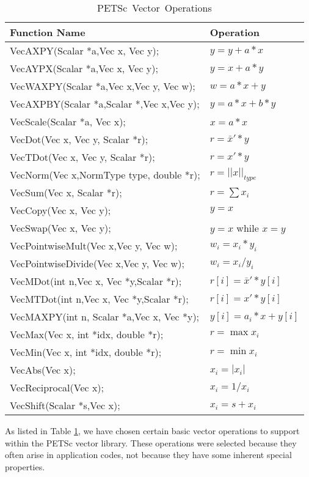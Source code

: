 \begin{table}[tb]
\begin{center}
\begin{tabular}{ll}
{\bf Function Name} & {\bf Operation} \\
\hline
VecAXPY(Scalar *a,Vec x, Vec y); & $y = y + a*x$ \\
VecAYPX(Scalar *a,Vec x, Vec y); & $y = x + a*y$ \\
VecWAXPY(Scalar *a,Vec x,Vec y, Vec w); & $w = a*x + y$ \\
VecAXPBY(Scalar *a,Scalar *,Vec x,Vec y); & $y = a*x + b*y$\\
VecScale(Scalar *a, Vec x); & $ x = a*x $\\
VecDot(Vec x, Vec y, Scalar *r); & $ r = \bar{x}'*y$\\
VecTDot(Vec x, Vec y, Scalar *r); & $ r = x'*y$\\
VecNorm(Vec x,NormType type,  double *r); & $ r = ||x||_{type}$\\
VecSum(Vec x,   Scalar *r); & $ r = \sum x_{i}$\\
VecCopy(Vec x, Vec y); & $ y = x $\\
VecSwap(Vec x, Vec y); & $ y = x $ while $ x = y$\\
VecPointwiseMult(Vec x,Vec y, Vec w); & $ w_{i} = x_{i}*y_{i} $ \\
VecPointwiseDivide(Vec x,Vec y, Vec w); & $ w_{i} = x_{i}/y_{i} $ \\
VecMDot(int n,Vec x, Vec *y,Scalar *r); & $ r[i] = \bar{x}'*y[i]$\\
VecMTDot(int n,Vec x, Vec *y,Scalar *r); & $ r[i] = x'*y[i]$\\
VecMAXPY(int n, Scalar *a,Vec x, Vec *y); \hspace{1cm} & $ y[i] = a_{i}*x + y[i] $ \\
VecMax(Vec x,  int *idx, double *r); & $ r = \max x_{i}$\\
VecMin(Vec x,  int *idx, double *r); & $ r = \min x_{i}$\\
VecAbs(Vec x); & $ x_i = |x_{i}|$\\
VecReciprocal(Vec x); & $ x_i = 1/x_{i}$\\
VecShift(Scalar *s,Vec x); & $ x_i = s + x_{i}$\\
\hline 
\end{tabular}
\end{center}
\caption{\hbox{PETSc Vector Operations}}
\label{fig:vectorops}
\end{table}

As listed in Table \ref{fig:vectorops}, we have chosen certain 
basic vector operations to support within the PETSc vector library.
These operations were selected because they often arise in application 
codes, not because they have some inherent special properties. 

